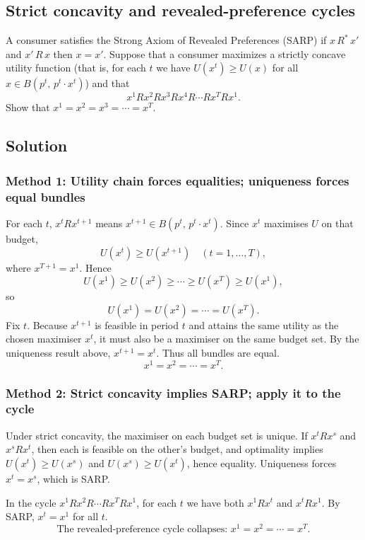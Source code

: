\documentclass[12pt]{article}
\newcommand{\dotp}{\cdot}
\begin{document}
\subsection{Strict concavity and revealed-preference cycles}
A consumer satisfies the Strong Axiom of Revealed Preferences (SARP) if \(x\,R^{*}\,x'\) and
\(x'\,R\,x\) then \(x=x'\).
Suppose that a consumer maximizes a strictly concave utility function (that is, for each \(t\) we have
\(U(x^{t})\ge U(x)\) for all \(x\in B(p^{t},\,p^{t}\dotp x^{t})\)) and that
\[
x^{1}R x^{2}R x^{3}R x^{4}R \cdots R x^{T}R x^{1}.
\]
Show that \(x^{1}=x^{2}=x^{3}=\cdots=x^{T}\).

\subsection*{Solution}
\subsubsection*{Method 1: Utility chain forces equalities; uniqueness forces equal bundles}
For each \(t\), \(x^{t}R x^{t+1}\) means \(x^{t+1}\in B(p^{t},\,p^{t}\dotp x^{t})\).
Since \(x^{t}\) maximises \(U\) on that budget,
\[
U(x^{t})\ge U(x^{t+1})\quad (t=1,\dots,T),
\]
where \(x^{T+1}=x^{1}\). Hence
\[
U(x^{1})\ge U(x^{2})\ge\cdots\ge U(x^{T})\ge U(x^{1}),
\]
so
\[
U(x^{1})=U(x^{2})=\cdots=U(x^{T}).
\]
Fix \(t\). Because \(x^{t+1}\) is feasible in period \(t\) and attains the same utility as the chosen maximiser \(x^{t}\),
it must also be a maximiser on the same budget set. By the uniqueness result above, \(x^{t+1}=x^{t}\).
Thus all bundles are equal.
\[
\boxed{x^{1}=x^{2}=\cdots=x^{T}.}
\]

\subsubsection*{Method 2: Strict concavity implies SARP; apply it to the cycle}
Under strict concavity, the maximiser on each budget set is unique. If \(x^{t}R x^{s}\) and \(x^{s}R x^{t}\),
then each is feasible on the other's budget, and optimality implies \(U(x^{t})\ge U(x^{s})\) and \(U(x^{s})\ge U(x^{t})\),
hence equality. Uniqueness forces \(x^{t}=x^{s}\), which is SARP.

In the cycle \(x^{1}R x^{2}R\cdots R x^{T}R x^{1}\), for each \(t\) we have both \(x^{1}R x^{t}\) and \(x^{t}R x^{1}\).
By SARP, \(x^{t}=x^{1}\) for all \(t\).
\[
\boxed{\text{The revealed-preference cycle collapses: }x^{1}=x^{2}=\cdots=x^{T}.}
\]
\end{document}
